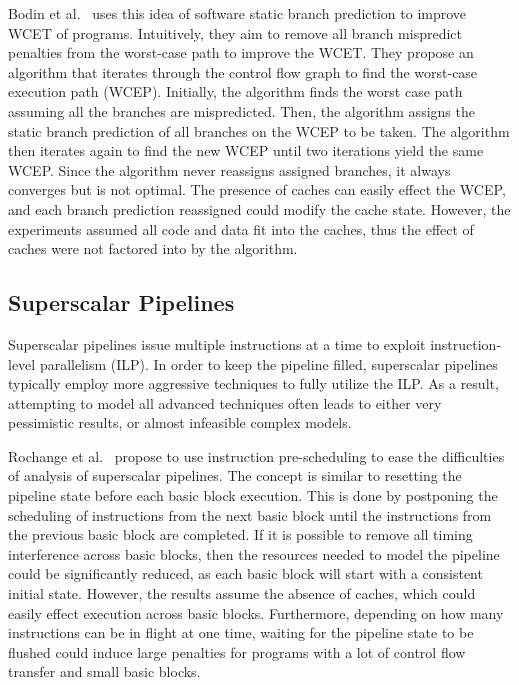 Bodin et al.~\cite{Bodin2005staticbranch} uses this idea of software static branch prediction to improve WCET of programs.
Intuitively, they aim to remove all branch mispredict penalties from the worst-case path to improve the WCET. 
They propose an algorithm that iterates through the control flow graph to find the worst-case execution path (WCEP). 
Initially, the algorithm finds the worst case path assuming all the branches are mispredicted. 
Then, the algorithm assigns the static branch prediction of all branches on the WCEP to be taken.
The algorithm then iterates again to find the new WCEP until two iterations yield the same WCEP.
Since the algorithm never reassigns assigned branches, it always converges but is not optimal.
The presence of caches can easily effect the WCEP, and each branch prediction reassigned could modify the cache state.
However, the experiments assumed all code and data fit into the caches, thus the effect of caches were not factored into by the algorithm.

\subsection{Superscalar Pipelines}
\label{sec:RTSuperscale}
Superscalar pipelines issue multiple instructions at a time to exploit instruction-level parallelism (ILP). 
In order to keep the pipeline filled, superscalar pipelines typically employ more aggressive techniques to fully utilize the ILP. 
As a result, attempting to model all advanced techniques often leads to either very pessimistic results, or almost infeasible complex models.

Rochange et al.~\cite{Rochange2005superscalar} propose to use instruction pre-scheduling to ease the difficulties of analysis of superscalar pipelines.  
The concept is similar to resetting the pipeline state before each basic block execution. 
This is done by postponing the scheduling of instructions from the next basic block until the instructions from the previous basic block are completed.
If it is possible to remove all timing interference across basic blocks, then the resources needed to model the pipeline could be significantly reduced, as each basic block will start with a consistent initial state.
However, the results assume the absence of caches, which could easily effect execution across basic blocks.  
Furthermore, depending on how many instructions can be in flight at one time, waiting for the pipeline state to be flushed could induce large penalties for programs with a lot of control flow transfer and small basic blocks. 


